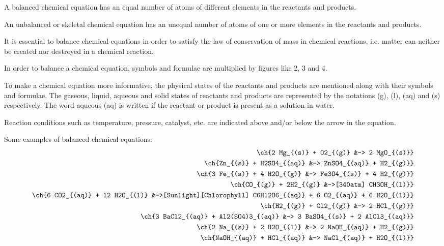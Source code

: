 \begin{outline}
    \1 A balanced chemical equation has an equal number of atoms of different elements in the reactants and products. 
    
    \1 An unbalanced or skeletal chemical equation has an unequal number of atoms of one or more elements in the reactants and products.

    \1 It is essential to balance chemical equations in order to satisfy the law of conservation of mass in chemical reactions, i.e. matter can neither be created nor destroyed in a chemical reaction.

    \1 In order to balance a chemical equation, symbols and formulae are multiplied by figures like 2, 3 and 4.

    \1 To make a chemical equation more informative, the physical states of the reactants and products are mentioned along with their symbols and formulae. The gaseous, liquid, aqueous and solid states of reactants and products are represented by the notations (g), (l), (aq) and (s) respectively. The word aqueous (aq) is written if the reactant or product is present as a solution in water.

    \1 Reaction conditions such as temperature, pressure, catalyst, etc. are indicated above and/or below the arrow in the equation.

    \1 Some examples of balanced chemical equations:
    \begin{align*}
        \ch{2 Mg_{(s)} + O2_{(g)} &-> 2 MgO_{(s)}} \\
        \ch{Zn_{(s)} + H2SO4_{(aq)} &-> ZnSO4_{(aq)} + H2_{(g)}} \\
        \ch{3 Fe_{(s)} + 4 H2O_{(g)} &-> Fe3O4_{(s)} + 4 H2_{(g)}} \\
        \ch{CO_{(g)} + 2H2_{(g)} &->[340atm] CH3OH_{(l)}} \\
        \ch{6 CO2_{(aq)} + 12 H2O_{(l)} &->[Sunlight][Chlorophyll] C6H12O6_{(aq)} + 6 O2_{(aq)} + 6 H2O_{(l)}} \\
        \ch{H2_{(g)} + Cl2_{(g)} &-> 2 HCl_{(g)}} \\
        \ch{3 BaCl2_{(aq)} + Al2(SO4)3_{(aq)} &-> 3 BaSO4_{(s)} + 2 AlCl3_{(aq)}} \\
        \ch{2 Na_{(s)} + 2 H2O_{(l)} &-> 2 NaOH_{(aq)} + H2_{(g)}} \\
        \ch{NaOH_{(aq)} + HCl_{(aq)} &-> NaCl_{(aq)} + H2O_{(l)}}
    \end{align*}
\end{outline}

